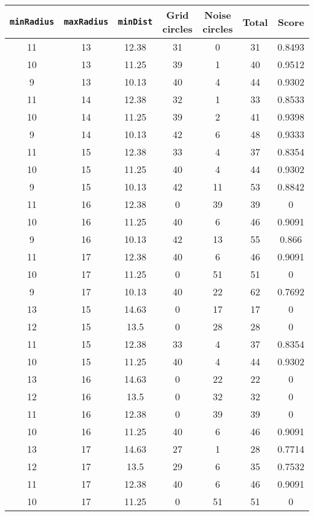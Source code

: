 \documentclass[letterpaper, 12pt]{article}
\begin{document}
\begin{longtable}{|c|c|c|c|c|c|c|}
\hline
\textbf{\texttt{minRadius}} & \textbf{\texttt{maxRadius}} & \textbf{\texttt{minDist}} & \textbf{Grid circles} & \textbf{Noise circles} & \textbf{Total} & \textbf{Score} \\
\hline
11 & 13 & 12.38 & 31 & 0 & 31 & 0.8493 \\
\hline
10 & 13 & 11.25 & 39 & 1 & 40 & 0.9512 \\
\hline
9 & 13 & 10.13 & 40 & 4 & 44 & 0.9302 \\
\hline
11 & 14 & 12.38 & 32 & 1 & 33 & 0.8533 \\
\hline
10 & 14 & 11.25 & 39 & 2 & 41 & 0.9398 \\
\hline
9 & 14 & 10.13 & 42 & 6 & 48 & 0.9333 \\
\hline
11 & 15 & 12.38 & 33 & 4 & 37 & 0.8354 \\
\hline
10 & 15 & 11.25 & 40 & 4 & 44 & 0.9302 \\
\hline
9 & 15 & 10.13 & 42 & 11 & 53 & 0.8842 \\
\hline
11 & 16 & 12.38 & 0 & 39 & 39 & 0 \\
\hline
10 & 16 & 11.25 & 40 & 6 & 46 & 0.9091 \\
\hline
9 & 16 & 10.13 & 42 & 13 & 55 & 0.866 \\
\hline
11 & 17 & 12.38 & 40 & 6 & 46 & 0.9091 \\
\hline
10 & 17 & 11.25 & 0 & 51 & 51 & 0 \\
\hline
9 & 17 & 10.13 & 40 & 22 & 62 & 0.7692 \\
\hline
13 & 15 & 14.63 & 0 & 17 & 17 & 0 \\
\hline
12 & 15 & 13.5 & 0 & 28 & 28 & 0 \\
\hline
11 & 15 & 12.38 & 33 & 4 & 37 & 0.8354 \\
\hline
10 & 15 & 11.25 & 40 & 4 & 44 & 0.9302 \\
\hline
13 & 16 & 14.63 & 0 & 22 & 22 & 0 \\
\hline
12 & 16 & 13.5 & 0 & 32 & 32 & 0 \\
\hline
11 & 16 & 12.38 & 0 & 39 & 39 & 0 \\
\hline
10 & 16 & 11.25 & 40 & 6 & 46 & 0.9091 \\
\hline
13 & 17 & 14.63 & 27 & 1 & 28 & 0.7714 \\
\hline
12 & 17 & 13.5 & 29 & 6 & 35 & 0.7532 \\
\hline
11 & 17 & 12.38 & 40 & 6 & 46 & 0.9091 \\
\hline
10 & 17 & 11.25 & 0 & 51 & 51 & 0 \\

\end{longtable}
\end{document}
